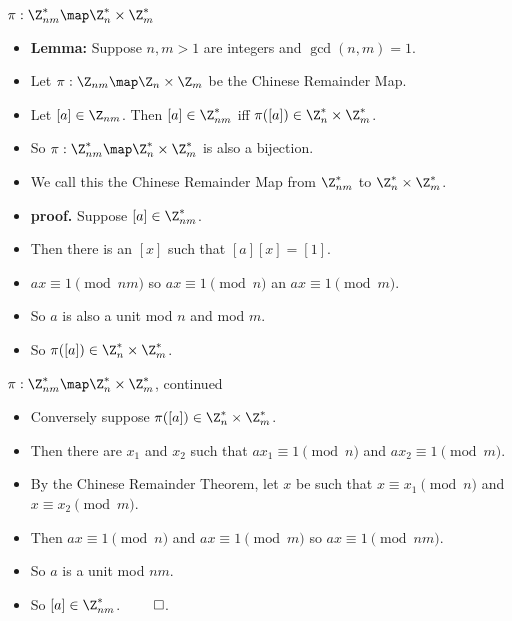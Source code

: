 \documentclass[handout]{beamer}
\begin{document}
\begin{frame}{$\pi:\Z^*_{nm}\map \Z^*_n\times \Z^*_m$}

\begin{itemize}
  \item \textbf{Lemma:} Suppose $n,m >1$ are integers and $\gcd(n,m)=1$.
  \item Let $\pi:\Z_{nm} \map \Z_n\times \Z_m$ be the Chinese Remainder Map.
  \item Let $[a]\in\Z_{nm}$. Then $[a]\in \Z^*_{nm}$ iff $\pi([a])\in \Z^*_n\times \Z^*_m$.
  \item So $\pi:\Z^*_{nm}\map \Z^*_n\times \Z^*_m$ is also a bijection.
  \item We call this the Chinese Remainder Map from $\Z^*_{nm}$ to $\Z^*_n\times \Z^*_m$.
  \item \textbf{proof.} Suppose $[a]\in\Z^*_{nm}$.
  \item Then there is an $[x]$ such that $[a][x]=[1]$.
  \item $ax \equiv 1 \pmod {nm}$ so $ax \equiv 1 \pmod{n}$ an $ax \equiv 1 \pmod{m}$.
  \item So $a$ is also a unit mod $n$ and mod $m$.
  \item So $\pi([a]) \in \Z^*_n\times \Z^*_m$.
\end{itemize}

\end{frame}

\begin{frame}{$\pi:\Z^*_{nm}\map \Z^*_n\times \Z^*_m$, continued}

\begin{itemize}
  \item Conversely suppose $\pi([a]) \in \Z^*_n\times \Z^*_m$.
  \item Then there are $x_1$ and $x_2$ such that $ax_1 \equiv 1 \pmod n$ and $ax_2 \equiv 1 \pmod m$.
  \item By the Chinese Remainder Theorem, let $x$ be such that $x\equiv x_1 \pmod n$ and $x\equiv x_2 \pmod m$.
  \item Then $ax \equiv 1 \pmod n$ and $ax\equiv 1 \pmod m$ so $ax\equiv 1 \pmod {nm}$.
  \item So $a$ is a unit mod $nm$.
  \item So $[a]\in\Z^*_{nm}$. $\qed$.
\end{itemize}

\end{frame}
\end{document}
